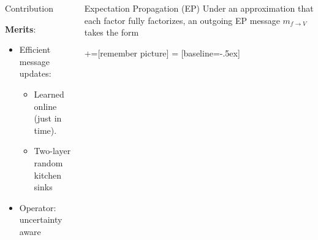 \documentclass[english]{beamer}
\DeclareMathOperator*{\proj}{\text{proj}} %
\begin{document}
\begin{frame}
\begin{columns}[t]
\begin{block}{Contribution }


\vspace*{3mm}
\textbf{Merits}:
\begin{itemize}

\item  Efficient message updates: 
    \begin{itemize}
        \item Learned online (just in time).
        \item Two-layer random kitchen sinks 
    \end{itemize}

\item Operator: uncertainty aware

\end{itemize}

\end{block}

\begin{block}{Expectation Propagation (EP)}
Under an approximation that each factor fully factorizes, an outgoing EP message $m_{f\rightarrow V}$ takes the form
\vspace{15mm}
 
+=[remember picture]
 = [baseline=-.5ex]



\end{block}
\end{columns}
\end{frame}
\end{document}
